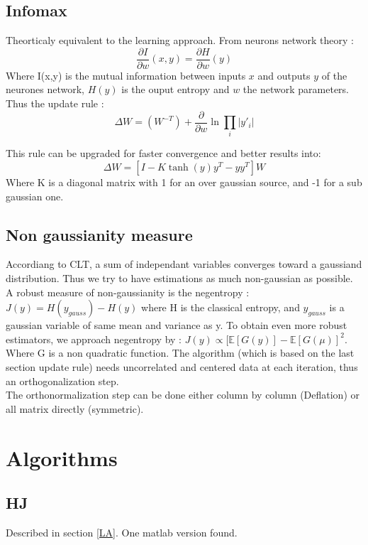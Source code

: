 \documentclass[a4paper,11pt,titlepage]{article}
\begin{document}
\subsection{Infomax}
Theorticaly equivalent to the learning approach. From neurons network theory :
\begin{equation*}
	\frac{\partial I}{\partial w}(x,y) = \frac{\partial H}{\partial w}(y)
\end{equation*}
Where I(x,y) is the mutual information between inputs $x$ and outputs $y$ of the neurones network, $H(y)$ is the ouput entropy and $w$ the network parameters.
Thus the update rule :
\begin{equation*}
	\Delta W = (W^{-T}) + \frac{\partial}{\partial w} \ln \prod\limits_i |y'_i|
\end{equation*}

This rule can be upgraded for faster convergence and better results into:
\begin{equation*}
	\Delta W = [I -K \tanh(y)y^T-yy^T]W
\end{equation*}
Where K is a diagonal matrix with 1 for an over gaussian source, and -1 for a sub gaussian one.
\subsection{Non gaussianity measure}
Accordiang to CLT, a sum of independant variables converges toward a gaussiand distribution. Thus we try to have estimations as much non-gaussian as possible. A robust measure of non-gaussianity is the negentropy : $J(y) = H(y_{gauss})-H(y)$ where H is the classical entropy, and $y_{gauss}$ is a gaussian variable of same mean and variance as y. To obtain even more robust estimators, we approach negentropy by : $J(y) \propto [\mathds{E}[G(y)]-\mathds{E}[G(\mu)]^2$.
Where G is a non quadratic function. The algorithm (which is based on the last section update rule) needs uncorrelated and centered data at each iteration, thus an orthogonalization step.\\

The orthonormalization step can be done either column by column (Deflation) or all matrix directly (symmetric).

\section{Algorithms}
\subsection{HJ}
Described in section \ref{LA}. One matlab version found.
\end{document}
